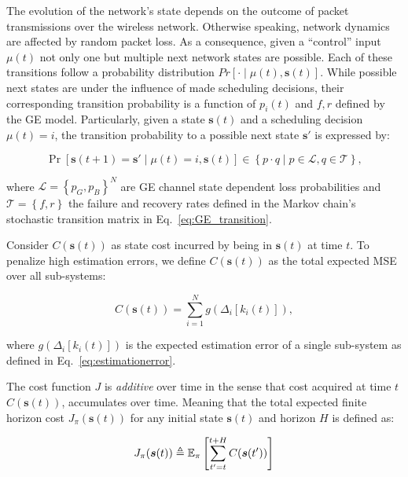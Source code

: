 The evolution of the network's state depends on the outcome of packet
transmissions over the wireless network. Otherwise speaking, network dynamics
are affected by random packet loss. As a consequence, given a ``control'' input
$\mu(t)$ not only one but multiple next network states are possible. Each of
these transitions follow a probability distribution $Pr\left[\cdot\mid\mu(t),
\boldsymbol{s}(t) \right]$. While possible next states are under the influence
of made scheduling decisions, their corresponding transition probability is a
function of $p_i(t)$ and $f,r$ defined by the GE model. Particularly, given a
state $\boldsymbol{s}(t)$ and a scheduling decision $\mu(t)=i$, the transition
probability to a possible next state $\boldsymbol{s'}$ is expressed by:

\begin{equation}
  \label{eq:transition}
  \Pr \left[ \boldsymbol{s}(t+1)=\boldsymbol{s}' \mid \mu(t)=i,\boldsymbol{s}(t)
  \right] \in \left\{ p \cdot q \mid p\in\mathcal{L},q\in\mathcal{T} \right\},
\end{equation}

where $\mathcal{L}=\left\{p_G,p_B\right\}^N$ are GE channel state dependent loss
probabilities and $\mathcal{T}=\left\{f,r\right\}$ the failure and recovery
rates defined in the Markov chain's stochastic transition matrix in
Eq.~\eqref{eq:GE_transition}.

Consider $C(\boldsymbol{s}(t))$ as state cost incurred by being in
$\boldsymbol{s}(t)$ at time $t$. To penalize high estimation errors, we define
$C(\boldsymbol{s}(t))$ as the total expected MSE over all sub-systems:

\begin{equation}
  \label{eq:gfunction}
  C(\boldsymbol{s}(t)) =  \sum_{i=1}^{N}  g(\Delta_i[k_i(t)]),
\end{equation}

where $g(\Delta_i[k_i(t)])$ is the expected estimation error of a single
sub-system as defined in Eq.~\eqref{eq:estimationerror}. 

The cost function $J$ is \textit{additive} over time in the sense that cost
acquired at time $t$ $C(\boldsymbol{s}(t))$, accumulates over time. Meaning that
the total expected finite horizon cost $J_{\pi}(\boldsymbol{s}(t))$ for any
initial state $\boldsymbol{s}(t)$ and horizon $H$ is defined as:

\begin{equation}
  \label{eq:horizoncost}	
  J_\pi(\boldsymbol{s}(t)) \triangleq \mathbb{E}_\pi \left[ \sum_{t' = t }^{t + H} C(\boldsymbol{s}(t')) \right] 
\end{equation}

